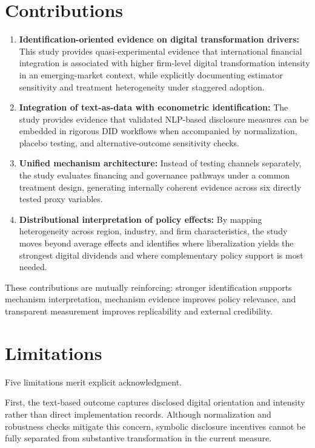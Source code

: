 \section{Contributions}

\begin{enumerate}
\item \textbf{Identification-oriented evidence on digital transformation drivers:} This study provides quasi-experimental evidence that international financial integration is associated with higher firm-level digital transformation intensity in an emerging-market context, while explicitly documenting estimator sensitivity and treatment heterogeneity under staggered adoption.

\item \textbf{Integration of text-as-data with econometric identification:} The study provides evidence that validated NLP-based disclosure measures can be embedded in rigorous DID workflows when accompanied by normalization, placebo testing, and alternative-outcome sensitivity checks.

\item \textbf{Unified mechanism architecture:} Instead of testing channels separately, the study evaluates financing and governance pathways under a common treatment design, generating internally coherent evidence across six directly tested proxy variables.

\item \textbf{Distributional interpretation of policy effects:} By mapping heterogeneity across region, industry, and firm characteristics, the study moves beyond average effects and identifies where liberalization yields the strongest digital dividends and where complementary policy support is most needed.
\end{enumerate}

These contributions are mutually reinforcing: stronger identification supports mechanism interpretation, mechanism evidence improves policy relevance, and transparent measurement improves replicability and external credibility.

\section{Limitations}

Five limitations merit explicit acknowledgment.

First, the text-based outcome captures disclosed digital orientation and intensity rather than direct implementation records. Although normalization and robustness checks mitigate this concern, symbolic disclosure incentives cannot be fully separated from substantive transformation in the current measure.

